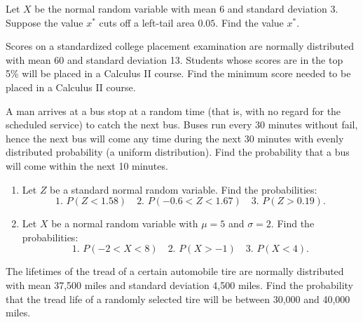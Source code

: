 \begin{example}

Let \(X\) be the normal random variable with mean \(6\) and standard
deviation \(3\). Suppose the value \(x^*\) cuts off a left-tail area
\(0.05\). Find the value \(x^*\).

\end{example}
\vspace*{4\baselineskip}

\begin{example}

Scores on a standardized college placement examination are normally
distributed with mean 60 and standard deviation 13. Students whose
scores are in the top 5\% will be placed in a Calculus II course. Find
the minimum score needed to be placed in a Calculus II course.

\end{example}
\vspace*{6\baselineskip}

\begin{exercise}

A man arrives at a bus stop at a random time (that is, with no regard for the scheduled service) to catch the next bus. Buses run every  30  minutes without fail, hence the next bus will come any time during the next  30  minutes with evenly distributed probability (a uniform distribution). Find the probability that a bus will come within the next  10  minutes.

\end{exercise}
\vspace*{6\baselineskip}

\begin{exercise}

\begin{enumerate}
\item
  Let \(Z\) be a standard normal random variable. Find the
  probabilities:
  \[\text{1.}\,\, P(Z<1.58)\quad \text{2.}\,\,  P(-0.6<Z<1.67)\quad \text{3.}\,\, P(Z>0.19).\]
\item
  Let \(X\) be a normal random variable with \(\mu=5\) and \(\sigma=2\).
  Find the probabilities:
  \[\text{1.}\,\,  P(-2<X<8)\quad \text{2.}\,\, P(X>-1) \quad \text{3.}\,\, P(X<4).\]
\end{enumerate}

\end{exercise}

\begin{exercise}

The lifetimes of the tread of a certain automobile tire are normally distributed with mean  37,500  miles and standard deviation  4,500  miles. Find the probability that the tread life of a randomly selected tire will be between  30,000  and  40,000  miles.

\end{exercise}
\vspace*{6\baselineskip}

